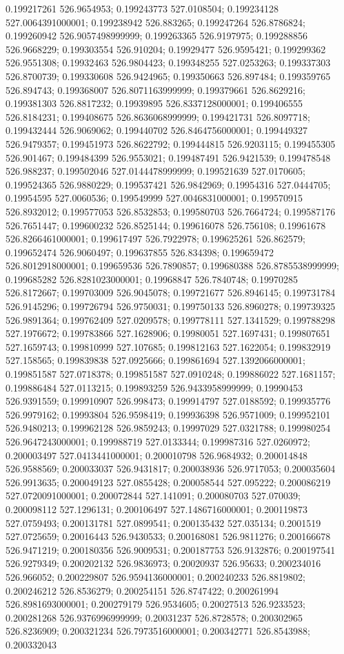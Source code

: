 0.199217261 526.9654953; 0.199243773 527.0108504; 0.199234128 527.0064391000001; 0.199238942 526.883265; 0.199247264 526.8786824; 0.199260942 526.9057498999999; 0.199263365 526.9197975; 0.199288856 526.9668229; 0.199303554 526.910204; 0.19929477 526.9595421; 0.199299362 526.9551308; 0.19932463 526.9804423; 0.199348255 527.0253263; 0.199337303 526.8700739; 0.199330608 526.9424965; 0.199350663 526.897484; 0.199359765 526.894743; 0.199368007 526.8071163999999; 0.199379661 526.8629216; 0.199381303 526.8817232; 0.19939895 526.8337128000001; 0.199406555 526.8184231; 0.199408675 526.8636068999999; 0.199421731 526.8097718; 0.199432444 526.9069062; 0.199440702 526.8464756000001; 0.199449327 526.9479357; 0.199451973 526.8622792; 0.199444815 526.9203115; 0.199455305 526.901467; 0.199484399 526.9553021; 0.199487491 526.9421539; 0.199478548 526.988237; 0.199502046 527.0144478999999; 0.199521639 527.0170605; 0.199524365 526.9880229; 0.199537421 526.9842969; 0.19954316 527.0444705; 0.19954595 527.0060536; 0.199549999 527.0046831000001; 0.199570915 526.8932012; 0.199577053 526.8532853; 0.199580703 526.7664724; 0.199587176 526.7651447; 0.199600232 526.8525144; 0.199616078 526.756108; 0.19961678 526.8266461000001; 0.199617497 526.7922978; 0.199625261 526.862579; 0.199652474 526.9060497; 0.199637855 526.834398; 0.199659472 526.8012918000001; 0.199659536 526.7890857; 0.199680388 526.8785538999999; 0.199685282 526.8281023000001; 0.19968847 526.7840748; 0.19970285 526.8172667; 0.199703009 526.9045078; 0.199721677 526.8946145; 0.199731784 526.9145296; 0.199726794 526.9750031; 0.199750133 526.8960278; 0.199739325 526.9891364; 0.199762409 527.0209578; 0.199778111 527.1341529; 0.199788298 527.1976672; 0.199783866 527.1628906; 0.19980051 527.1697431; 0.199807651 527.1659743; 0.199810999 527.107685; 0.199812163 527.1622054; 0.199832919 527.158565; 0.199839838 527.0925666; 0.199861694 527.1392066000001; 0.199851587 527.0718378; 0.199851587 527.0910248; 0.199886022 527.1681157; 0.199886484 527.0113215; 0.199893259 526.9433958999999; 0.19990453 526.9391559; 0.199910907 526.998473; 0.199914797 527.0188592; 0.199935776 526.9979162; 0.19993804 526.9598419; 0.199936398 526.9571009; 0.199952101 526.9480213; 0.199962128 526.9859243; 0.19997029 527.0321788; 0.199980254 526.9647243000001; 0.199988719 527.0133344; 0.199987316 527.0260972; 0.200003497 527.0413441000001; 0.200010798 526.9684932; 0.200014848 526.9588569; 0.200033037 526.9431817; 0.200038936 526.9717053; 0.200035604 526.9913635; 0.200049123 527.0855428; 0.200058544 527.095222; 0.200086219 527.0720091000001; 0.200072844 527.141091; 0.200080703 527.070039; 0.200098112 527.1296131; 0.200106497 527.1486716000001; 0.200119873 527.0759493; 0.200131781 527.0899541; 0.200135432 527.035134; 0.2001519 527.0725659; 0.20016443 526.9430533; 0.200168081 526.9811276; 0.200166678 526.9471219; 0.200180356 526.9009531; 0.200187753 526.9132876; 0.200197541 526.9279349; 0.200202132 526.9836973; 0.20020937 526.95633; 0.200234016 526.966052; 0.200229807 526.9594136000001; 0.200240233 526.8819802; 0.200246212 526.8536279; 0.200254151 526.8747422; 0.200261994 526.8981693000001; 0.200279179 526.9534605; 0.20027513 526.9233523; 0.200281268 526.9376996999999; 0.20031237 526.8728578; 0.200302965 526.8236909; 0.200321234 526.7973516000001; 0.200342771 526.8543988; 0.200332043 